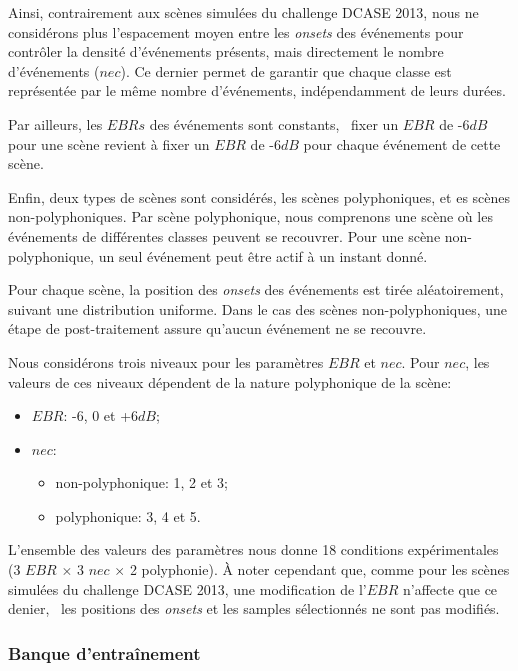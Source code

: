 Ainsi, contrairement aux scènes simulées du challenge DCASE 2013, nous ne considérons plus l'espacement moyen entre les \emph{onsets} des événements pour contrôler la densité d'événements présents, mais directement le nombre d'événements ($nec$). Ce dernier permet de garantir que chaque classe est représentée par le même nombre d'événements, indépendamment de leurs durées. 

Par ailleurs, les $EBRs$ des événements sont constants, \ie~fixer un $EBR$ de -6$dB$ pour une scène revient à fixer un $EBR$ de -6$dB$ pour chaque événement de cette scène.

Enfin, deux types de scènes sont considérés,  les scènes polyphoniques, et es scènes non-polyphoniques. Par scène polyphonique, nous comprenons une scène où les événements de différentes classes peuvent se recouvrer. Pour une scène non-polyphonique, un seul événement peut être actif à un instant donné.

Pour chaque scène, la position des \emph{onsets} des événements est tirée aléatoirement, suivant une distribution uniforme. Dans le cas des scènes non-polyphoniques, une étape de post-traitement assure qu'aucun événement ne se recouvre.

Nous considérons trois niveaux pour les paramètres $EBR$ et $nec$. Pour $nec$, les valeurs de ces niveaux dépendent de la nature polyphonique de la scène:

\begin{itemize}
\item $EBR$: -6, 0 et +6$dB$;
\item $nec$: 
\begin{itemize}
\item non-polyphonique: 1, 2 et 3;
\item polyphonique: 3, 4 et 5.
\end{itemize}
\end{itemize}

L'ensemble des valeurs des paramètres nous donne 18 conditions expérimentales (3 $EBR$ $\times$ 3 $nec$ $\times$ 2 polyphonie). À noter cependant que, comme pour les scènes simulées du challenge DCASE 2013, une modification de l'$EBR$ n'affecte que ce denier, \ie~les positions des \emph{onsets} et les samples sélectionnés ne sont pas modifiés.

\subsubsection{Banque d'entraînement}

